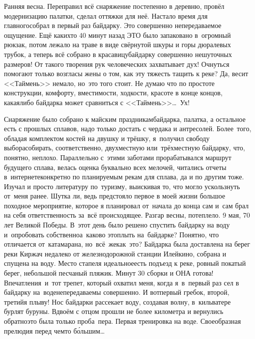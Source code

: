 Ранняя весна. Переправил всё снаряжение постепенно в деревню, провёл модернизацию палатки, сделал оттяжки для неё. Настало время для главного\mdash собрал в первый раз байдарку. Это совершенно непередаваемое ощущение. Ещё каких\sdash то 40 минут назад ЭТО было запаковано в~огромный рюкзак, потом лежало на траве в виде свёрнутой шкуры и горы дюралевых трубок, а теперь всё собрано в красавицу\sdash байдарку совершенно нешуточных размеров! От такого творения рук человеческих захватывает дух! Очнуться помогают только возгласы жены о том, как эту тяжесть тащить к реке? Да, весит <<Таймень>> немало, но~это того стоит. Не думаю что по простоте конструкции, комфорту, вместимости, ходкости, красоте в конце концов, какая\sdash либо байдарка может сравниться с <<Таймень>>\ldots~Ух! 

Снаряжение было собрано к майским праздникам\mdash байдарка, палатка, а остальное есть с прошлых сплавов, надо только достать с чердака и антресолей. Более~того, обладая комплектом костей на двушку и трёшку, я~получил свободу выбора\mdash собирать, соответственно, двухместную или~трёхместную байдарку, что, понятно, неплохо. Параллельно с~этими заботами прорабатывался маршрут будущего сплава, велась оценка буквально всех мелочей, читались отчеты в~интернете\mdash конкретно по планируемым рекам для сплава, да и по другим тоже. Изучал и просто литературу по~туризму, выискивая то, что могло ускользнуть от~меня ранее. Шутка ли, ведь предстояло первое в моей жизни большое походное мероприятие, которое я планировал от~начала до конца сам и~сам брал на себя ответственность за~всё происходящее.
\newpage
Разгар весны, потеплело. 9 мая, 70 лет Великой Победы. В~этот день было решено спустить байдарку на воду и~опробовать собственно\mdash а~каково это\mdash плыть на~байдарке? Понятно, что отличается от~катамарана, но~всё~же\mdash как~это? Байдарка была доставлена на берег реки Киржач недалеко от железнодорожной станции Илейкино, собрана и спущена на воду. Место стапеля идеальное\mdash есть подъезд к реке, ровный покатый берег, небольшой песчаный пляжик. Минут 30 сборки и ОНА готова! Впечатления~и~тот трепет, который охватил меня, когда я~в~первый раз сел в байдарку на~воде\mdash непередаваемы совершенно. И вот\mdash первый гребок, второй, третий\mdash я плыву! Нос байдарки рассекает воду, создавая волну, в~кильватере бурлят буруны. Вдвоём с отцом прошли не более километра и вернулись обратно\mdash это была только проба~пера. Первая тренировка на воде. Своеобразная прелюдия перед чем\sdash то б\'{о}льшим\ldots
 
